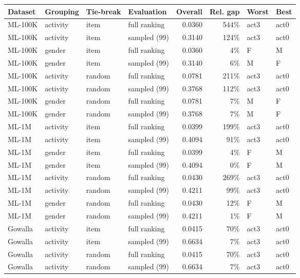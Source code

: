 \begin{tabular}{llllrrll}
\toprule
Dataset & Grouping & Tie-break & Evaluation & Overall & Rel. gap & Worst & Best \\
\midrule
ML-100K & activity & item & full ranking & 0.0360 & 544\% & act3 & act0 \\
ML-100K & activity & item & sampled (99) & 0.3140 & 124\% & act3 & act0 \\
ML-100K & gender & item & full ranking & 0.0360 & 4\% & F & M \\
ML-100K & gender & item & sampled (99) & 0.3140 & 6\% & M & F \\
ML-100K & activity & random & full ranking & 0.0781 & 211\% & act3 & act0 \\
ML-100K & activity & random & sampled (99) & 0.3768 & 112\% & act3 & act0 \\
ML-100K & gender & random & full ranking & 0.0781 & 7\% & M & F \\
ML-100K & gender & random & sampled (99) & 0.3768 & 7\% & M & F \\
ML-1M & activity & item & full ranking & 0.0399 & 199\% & act3 & act0 \\
ML-1M & activity & item & sampled (99) & 0.4094 & 91\% & act3 & act0 \\
ML-1M & gender & item & full ranking & 0.0399 & 4\% & F & M \\
ML-1M & gender & item & sampled (99) & 0.4094 & 0\% & F & M \\
ML-1M & activity & random & full ranking & 0.0430 & 269\% & act3 & act0 \\
ML-1M & activity & random & sampled (99) & 0.4211 & 99\% & act3 & act0 \\
ML-1M & gender & random & full ranking & 0.0430 & 12\% & F & M \\
ML-1M & gender & random & sampled (99) & 0.4211 & 1\% & F & M \\
Gowalla & activity & item & full ranking & 0.0415 & 70\% & act3 & act0 \\
Gowalla & activity & item & sampled (99) & 0.6634 & 7\% & act3 & act0 \\
Gowalla & activity & random & full ranking & 0.0415 & 70\% & act3 & act0 \\
Gowalla & activity & random & sampled (99) & 0.6634 & 7\% & act3 & act0 \\
\bottomrule
\end{tabular}
